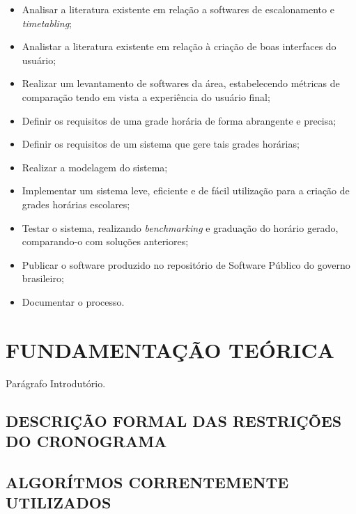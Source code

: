 \documentclass[12pt,a4paper]{article}
\begin{document}
			\begin{itemize}
				\item Analisar a literatura existente em relação a softwares de escalonamento e \textit{timetabling};
				\item Analistar a literatura existente em relação à criação de boas interfaces do usuário;
				\item Realizar um levantamento de softwares da área, estabelecendo métricas de comparação tendo em vista a experiência do usuário final;
				\item Definir os requisitos de uma grade horária de forma abrangente e precisa;
				\item Definir os requisitos de um sistema que gere tais grades horárias;
				\item Realizar a modelagem do sistema;
				\item Implementar um sistema leve, eficiente e de fácil utilização para a criação de grades horárias escolares;
				\item Testar o sistema, realizando \textit{benchmarking} e graduação do horário gerado, com\-pa\-ran\-do-o com soluções anteriores;
				\item Publicar o software produzido no repositório de Software Público do governo brasileiro;
				\item Documentar o processo.
			\end{itemize}

	\newpage


	\section{FUNDAMENTAÇÃO TEÓRICA}

		\par Parágrafo Introdutório.

		\subsection{DESCRIÇÃO FORMAL DAS RESTRIÇÕES DO CRONOGRAMA}

			\lipsum[1]

		\subsection{ALGORÍTMOS CORRENTEMENTE UTILIZADOS}

			\lipsum[1]
\end{document}
